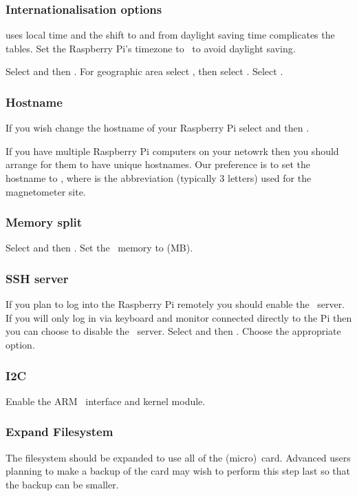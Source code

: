 \subsubsection{Internationalisation options}
 uses local time and the shift to and from daylight
saving time complicates the  tables. Set the Raspberry
Pi's timezone to \utc\ to avoid daylight saving.

Select  and
then . For geographic area select %
, then select \code{\utc}. Select .

\subsubsection{Hostname} 

If you wish change the hostname of your Raspberry Pi select
 and then .

If you have multiple Raspberry Pi computers on your netowrk then you
should arrange for them to have unique hostnames. Our preference is to
set the hostname to , where  is the
abbreviation (typically 3 letters) used for the magnetometer site.

\subsubsection{Memory split}
Select  and then . Set the \gpu\ memory to  (MB).

\subsubsection{SSH server}
If you plan to log into the Raspberry Pi remotely you should enable
the \ssh\ server. If you will only log in via keyboard and monitor
connected directly to the Pi then you can choose to disable the \ssh\
server.
Select  and then . Choose the
appropriate option.

\subsubsection{I2C}
Enable the ARM \itwoc\ interface and kernel module.

\subsubsection{Expand Filesystem}
The filesystem should be expanded to use all of the (micro)\sd\
card. Advanced users planning to make a backup of the card may wish to
perform this step last so that the backup can be smaller.

